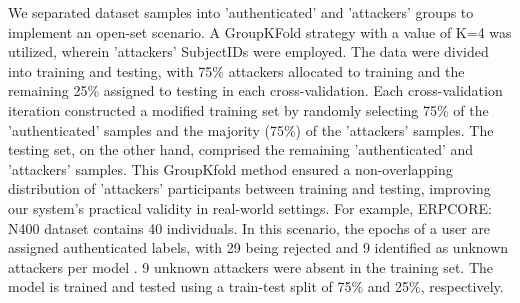 We separated dataset samples into 'authenticated' and 'attackers' groups to implement an open-set scenario. A GroupKFold strategy with a value of K=4 was utilized, wherein 'attackers' SubjectIDs were employed. The data were divided into training and testing, with 75$\%$ attackers allocated to training and the remaining 25$\%$ assigned to testing in each cross-validation. Each cross-validation iteration constructed a modified training set by randomly selecting 75$\%$ of the 'authenticated' samples and the majority (75$\%$) of the 'attackers' samples. The testing set, on the other hand, comprised the remaining 'authenticated' and 'attackers' samples. This GroupKfold method ensured a non-overlapping distribution of 'attackers' participants between training and testing, improving our system's practical validity in real-world settings. For example, ERPCORE: N400 dataset contains 40 individuals. In this scenario, the epochs of a user are assigned authenticated labels, with 29 being rejected and 9 identified as unknown attackers per model \cite{arias2023performance}.  9 unknown attackers were absent in the training set. The model is trained and tested using a train-test split of 75$\%$ and 25$\%$, respectively. 








